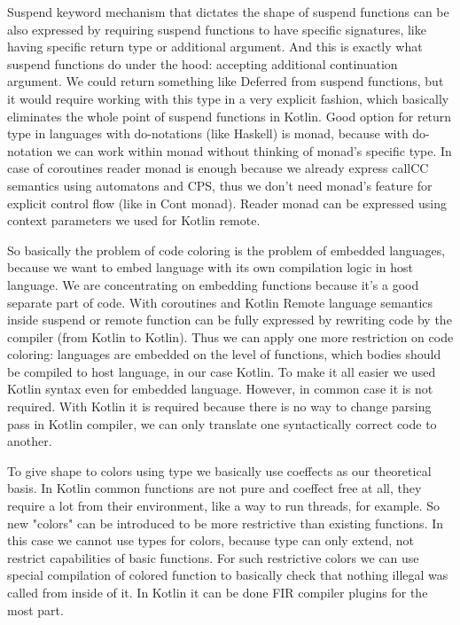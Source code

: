 \documentclass[a4paper,11pt,oneside]{article}
\begin{document}
Suspend keyword mechanism that dictates the shape of suspend functions can be also expressed by
requiring suspend functions to have specific signatures, like having specific return type or
additional argument. And this is exactly what suspend functions do under the hood: accepting
additional continuation argument. We could return something like Deferred from suspend functions,
but it would require working with this type in a very explicit fashion, which basically eliminates
the whole point of suspend functions in Kotlin. Good option for return type in languages with
do-notations (like Haskell) is monad, because with do-notation we can work within monad without
thinking of monad's specific type. In case of coroutines reader monad is enough because we already
express callCC semantics using automatons and CPS, thus we don't need monad's feature for explicit
control flow (like in Cont monad). Reader monad can be expressed using context parameters we used
for Kotlin remote.

So basically the problem of code coloring is the problem of embedded languages, because we want to
embed language with its own compilation logic in host language. We are concentrating on embedding
functions because it's a good separate part of code. With coroutines and Kotlin Remote language
semantics inside suspend or remote function can be fully expressed by rewriting code by the
compiler (from Kotlin to Kotlin). Thus we can apply one more restriction on code coloring:
languages are embedded on the level of functions, which bodies should be compiled to host language,
in our case Kotlin. To make it all easier we used Kotlin syntax even for embedded language.
However, in common case it is not required. With Kotlin it is required because there is no way to
change parsing pass in Kotlin compiler, we can only translate one syntactically correct code to
another.

To give shape to colors using type we basically use coeffects as our theoretical basis.
In Kotlin common functions are not pure and coeffect free at all, they require a lot from their environment,
like a way to run threads, for example. So new "colors" can be introduced to be more restrictive than 
existing functions. In this case we cannot use types for colors, because type can only 
extend, not restrict capabilities of basic functions. For such restrictive colors we can 
use special compilation of colored function to basically check that nothing illegal was called from inside of it. 
In Kotlin it can be done FIR compiler plugins for the most part.
\end{document}
